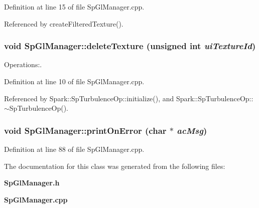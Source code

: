 Definition at line 15 of file Sp\-Gl\-Manager.cpp.

Referenced by create\-Filtered\-Texture().
\subsubsection{\setlength{\rightskip}{0pt plus 5cm}void Sp\-Gl\-Manager::delete\-Texture (unsigned int {\em ui\-Texture\-Id})\hspace{0.3cm}{\tt  [static]}}\label{classSpark_1_1SpGlManager_e0}


Operations:. 

Definition at line 10 of file Sp\-Gl\-Manager.cpp.

Referenced by Spark::Sp\-Turbulence\-Op::initialize(), and Spark::Sp\-Turbulence\-Op::$\sim$Sp\-Turbulence\-Op().
\subsubsection{\setlength{\rightskip}{0pt plus 5cm}void Sp\-Gl\-Manager::print\-On\-Error (char $\ast$ {\em ac\-Msg})\hspace{0.3cm}{\tt  [static]}}\label{classSpark_1_1SpGlManager_e3}


Definition at line 88 of file Sp\-Gl\-Manager.cpp.

The documentation for this class was generated from the following files:\begin{CompactItemize}
\item 
{\bf Sp\-Gl\-Manager.h}\item 
{\bf Sp\-Gl\-Manager.cpp}\end{CompactItemize}
